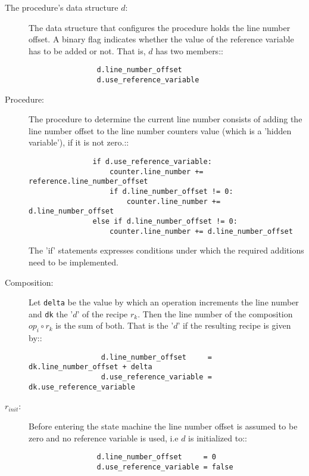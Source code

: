 \documentclass[12pt,a4paper]{scrartcl}
\begin{document}
\begin{description}
    \item[The procedure's data structure $d$:] The data structure that configures
        the procedure holds the line number offset. A binary flag indicates whether
        the value of the reference variable has to be added or not. That is, $d$
        has two members::

        \begin{verbatim}
                d.line_number_offset
                d.use_reference_variable
        \end{verbatim}
        
    \item[Procedure:] The procedure to determine the current line number
        consists of adding the line number offset to the line number
        counters value (which is a 'hidden variable'), if it is not zero.::

        \begin{verbatim}
               if d.use_reference_variable:
                   counter.line_number += reference.line_number_offset 
                   if d.line_number_offset != 0:
                       counter.line_number += d.line_number_offset 
               else if d.line_number_offset != 0:
                   counter.line_number += d.line_number_offset
        \end{verbatim}

        The 'if' statements expresses conditions under which the required
        additions need to be implemented.

   \item[Composition:] Let \verb/delta/ be the value by which an operation increments
       the line number and \verb/dk/ the '$d$' of the recipe $r_k$.
       Then the line number of the composition $op_i\circ r_k$ is the sum of
       both. That is the '$d$' if the resulting recipe is given by::

        \begin{verbatim}
                 d.line_number_offset     = dk.line_number_offset + delta
                 d.use_reference_variable = dk.use_reference_variable
        \end{verbatim}

   \item[$r_{init}$:] Before entering the state machine the line number offset
        is assumed to be zero and no reference variable is used, i.e $d$ is
        initialized to::

        \begin{verbatim}
                d.line_number_offset     = 0
                d.use_reference_variable = false
        \end{verbatim}


\end{description}
\end{document}
